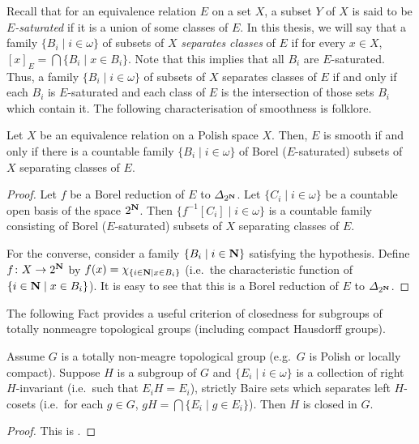	Recall that for an equivalence relation $E$ on a set $X$, a subset $Y$ of $X$ is said to be {\em $E$-saturated} if it is a union of some classes of $E$. In this thesis, we will say that a family $\{B_i \mid i \in \omega\}$ of subsets of $X$ {\em separates classes} of $E$ if for every $x \in X$, $[x]_E= \bigcap \{ B_i \mid x \in B_i\}$. Note that this implies that all $B_i$ are $E$-saturated. Thus, a family $\{B_i \mid i \in \omega\}$ of subsets of $X$ separates classes of $E$ if and only if each $B_i$ is $E$-saturated and each class of $E$ is the intersection of those sets $B_i$ which contain it.
	The following characterisation of smoothness is folklore.
	
	\begin{fct}\label{fct:separating_family}
		Let $X$ be an equivalence relation on a Polish space $X$. Then, $E$ is smooth if and only if there is a countable family $\{B_i\mid i \in \omega\}$ of Borel ($E$-saturated) subsets of $X$ separating classes of $E$.
	\end{fct}
	\begin{proof}
		Let $f$ be a Borel reduction of $E$ to $\Delta_{2^{{\mathbf{N}}}}$. Let $\{C_i\mid i \in \omega\}$ be a countable open basis of the space $2^{{\mathbf{N}}}$. Then $\{f^{-1}[C_i]\mid i \in \omega \}$ is a countable family consisting of Borel ($E$-saturated) subsets of $X$ separating classes of $E$.
		
		For the converse, consider a family $\{ B_i \mid i \in {\mathbf{N}}\}$ satisfying the hypothesis. Define $f \colon X \to 2^{{\mathbf{N}}}$ by $f(x) = \chi_{\{i \in {\mathbf{N}} \mid x \in B_i\}}$ (i.e.\ the characteristic function of ${\{i \in {\mathbf{N}} \mid x \in B_i\}}$). It is easy to see that this is a Borel reduction of $E$ to $\Delta_{2^{{\mathbf{N}}}}$.
	\end{proof}
	
	
	The following Fact provides a useful criterion of closedness for subgroups of totally nonmeagre topological groups (including compact Hausdorff groups).
	\begin{fct}\label{fct:miller}
		Assume $G$ is a totally non-meagre topological group (e.g.\ $G$ is Polish or locally compact). Suppose $H$ is a subgroup of $G$ and $\{E_i \mid i \in \omega\}$ is a collection of right $H$-invariant (i.e.\ such that $E_iH=E_i$), strictly Baire sets which separates left $H$-cosets (i.e.\ for each $g \in G$, $gH= \bigcap \{ E_i \mid g \in E_i\}$). Then $H$ is closed in $G$.
	\end{fct}
	\begin{proof}
		This is \cite[Theorem 1]{Mil77}.
	\end{proof}
	
